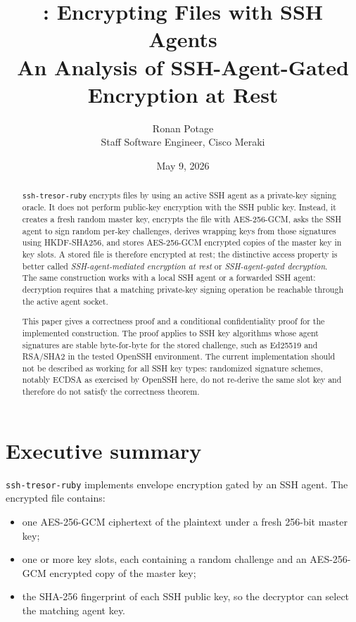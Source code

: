 \documentclass[11pt]{article}
\title{\Project{}: Encrypting Files with SSH Agents\\[0.4em]\large An Analysis of SSH-Agent-Gated Encryption at Rest}
\author{Ronan Potage\\Staff Software Engineer, Cisco Meraki}
\date{May 9, 2026}
\theoremstyle{definition}
\theoremstyle{plain}
\newcommand{\Project}{\texttt{ssh-tresor-ruby}}
\begin{document}
\maketitle

\begin{abstract}
\Project{} encrypts files by using an active SSH agent as a private-key signing oracle. It does not perform public-key encryption with the SSH public key. Instead, it creates a fresh random master key, encrypts the file with AES-256-GCM, asks the SSH agent to sign random per-key challenges, derives wrapping keys from those signatures using HKDF-SHA256, and stores AES-256-GCM encrypted copies of the master key in key slots. A stored file is therefore encrypted at rest; the distinctive access property is better called \emph{SSH-agent-mediated encryption at rest} or \emph{SSH-agent-gated decryption}. The same construction works with a local SSH agent or a forwarded SSH agent: decryption requires that a matching private-key signing operation be reachable through the active agent socket.

This paper gives a correctness proof and a conditional confidentiality proof for the implemented construction. The proof applies to SSH key algorithms whose agent signatures are stable byte-for-byte for the stored challenge, such as Ed25519 and RSA/SHA2 in the tested OpenSSH environment. The current implementation should not be described as working for all SSH key types: randomized signature schemes, notably ECDSA as exercised by OpenSSH here, do not re-derive the same slot key and therefore do not satisfy the correctness theorem.
\end{abstract}

\section{Executive summary}

\Project{} implements envelope encryption gated by an SSH agent. The encrypted file contains:

\begin{itemize}[leftmargin=*]
  \item one AES-256-GCM ciphertext of the plaintext under a fresh 256-bit master key;
  \item one or more key slots, each containing a random challenge and an AES-256-GCM encrypted copy of the master key;
  \item the SHA-256 fingerprint of each SSH public key, so the decryptor can select the matching agent key.
\end{itemize}
\end{document}
